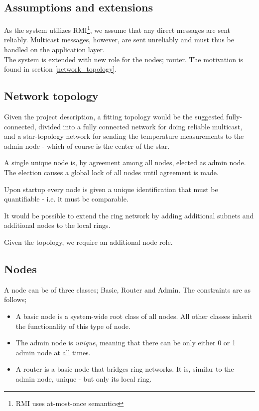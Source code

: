 \documentclass[10pt,a4paper]{article}
\begin{document}
\subsection{Assumptions and extensions}
As the system utilizes RMI\footnote{RMI uses at-most-once semantics}, we assume that any direct messages are sent reliably. Multicast messages, however, are sent unreliably and must thus be handled on the application layer.\\

The system is extended with new role for the nodes; router. The motivation is found in section \ref{network_topology}.

\subsection{Network topology}
Given the project description, a fitting topology would be the suggested fully-connected, divided into a fully connected network for doing reliable multicast, and a star-topology network for sending the temperature measurements to the admin node - which of course is the center of the star.

\label{network_topology}
A single unique node is, by agreement among all nodes, elected as admin node. The election causes a global lock of all nodes until agreement is made.

Upon startup every node is given a unique identification that must be quantifiable - i.e. it must be comparable.

It would be possible to extend the ring network by adding additional subnets and additional nodes to the local rings.

Given the topology, we require an additional node role.

\subsection{Nodes}
A node can be of three classes; Basic, Router and Admin. The constraints are as follows;
\begin{itemize}
\item A basic node is a system-wide root class of all nodes. All other classes inherit the functionality of this type of node.
\item The admin node is \emph{unique}, meaning that there can be only either 0 or 1 admin node at all times.
\item A router is a basic node that bridges ring networks. It is, similar to the admin node, unique - but only its local ring.
\end{itemize}
\end{document}
